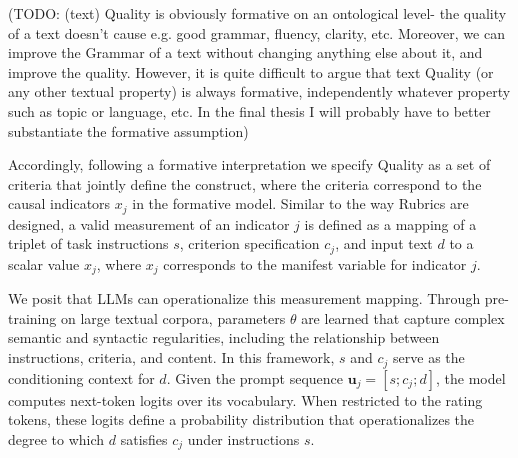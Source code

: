  (TODO: (text) Quality is obviously formative on an ontological level- the quality of a text doesn't cause e.g. good grammar, fluency, clarity, etc. Moreover, we can improve the Grammar of a text without changing anything else about it, and improve the quality. However, it is quite difficult to argue that text Quality (or any other textual property) is always formative, independently whatever property such as topic or language, etc. In the final thesis I will probably have to better substantiate the formative assumption)





Accordingly, following a formative interpretation we specify Quality as a set of criteria that jointly define the construct, where the criteria correspond to the causal indicators $x_j$ in the formative model. Similar to the way Rubrics are designed, a valid measurement of an indicator $j$ is defined as a mapping of a triplet of task instructions $s$, criterion specification $c_j$, and input text $d$ to a scalar value $x_j$, where $x_j$ corresponds to the manifest variable for indicator $j$. 

We posit that LLMs can operationalize this measurement mapping. Through pre-training on large textual corpora, parameters $\theta$ are learned that capture complex semantic and syntactic regularities, including the relationship between instructions, criteria, and content. In this framework, $s$ and $c_j$ serve as the conditioning context for $d$. Given the prompt sequence $\mathbf{u}_j = [s; c_j; d]$, the model computes next-token logits over its vocabulary. When restricted to the rating tokens, these logits define a probability distribution that operationalizes the degree to which $d$ satisfies $c_j$ under instructions $s$. 

